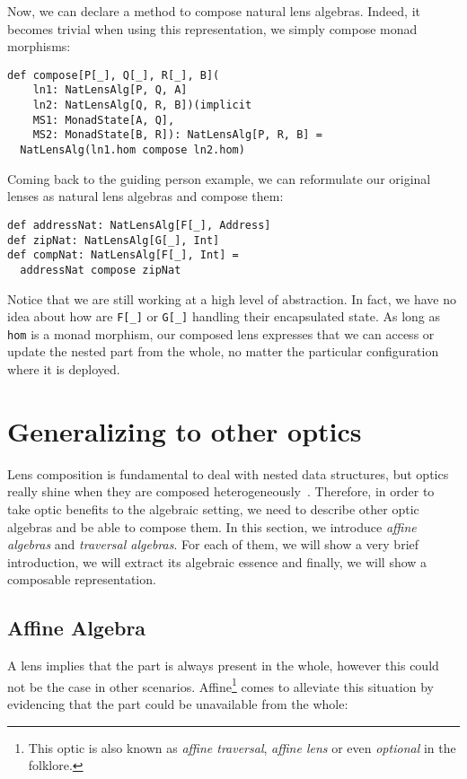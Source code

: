 \documentclass[preview, 3p]{elsarticle}
\begin{document}
Now, we can declare a method to compose natural lens algebras. Indeed, it
becomes trivial when using this representation, we simply compose monad
morphisms:

\begin{lstlisting}
def compose[P[_], Q[_], R[_], B](
    ln1: NatLensAlg[P, Q, A]
    ln2: NatLensAlg[Q, R, B])(implicit
    MS1: MonadState[A, Q],
    MS2: MonadState[B, R]): NatLensAlg[P, R, B] =
  NatLensAlg(ln1.hom compose ln2.hom)
\end{lstlisting}

Coming back to the guiding person example, we can reformulate our original
lenses as natural lens algebras and compose them:

\begin{lstlisting}
def addressNat: NatLensAlg[F[_], Address]
def zipNat: NatLensAlg[G[_], Int]
def compNat: NatLensAlg[F[_], Int] =
  addressNat compose zipNat
\end{lstlisting}

Notice that we are still working at a high level of abstraction. In fact, we
have no idea about how are \lstinline{F[_]} or \lstinline{G[_]} handling their
encapsulated state. As long as \lstinline{hom} is a monad morphism, our composed
lens expresses that we can access or update the nested part from the whole, no
matter the particular configuration where it is deployed.

\section{Generalizing to other optics}
\label{sec:Generalizing}

Lens composition is fundamental to deal with nested data structures, but optics
really shine when they are composed
heterogeneously~\cite{pickering2017profunctor}. Therefore, in order to take
optic benefits to the algebraic setting, we need to describe other optic
algebras and be able to compose them. In this section, we introduce \emph{affine
algebras} and \emph{traversal algebras}. For each of them, we will show a very
brief introduction, we will extract its algebraic essence and finally, we will
show a composable representation.

\subsection{Affine Algebra}

A lens implies that the part is always present in the whole, however this could
not be the case in other scenarios. Affine\footnote{This optic is also known as
\emph{affine traversal}, \emph{affine lens} or even \emph{optional} in the
folklore.} comes to alleviate this situation by evidencing that the part could
be unavailable from the whole:
\end{document}
